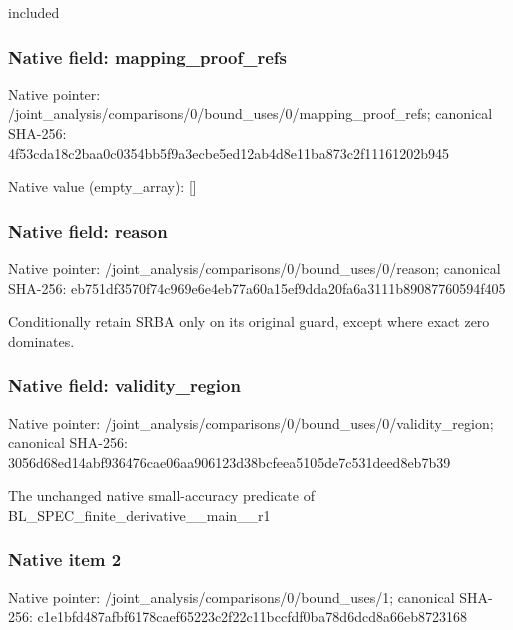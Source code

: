 \documentclass[10pt,a4paper]{article}
\begin{document}
\begingroup\raggedright\sloppy included\par\endgroup

\subsubsection{Native field: mapping\_\allowbreak{}proof\_\allowbreak{}refs}
Native pointer: /joint\_\allowbreak{}analysis/comparisons/0/bound\_\allowbreak{}uses/0/mapping\_\allowbreak{}proof\_\allowbreak{}refs; canonical SHA-256: 4f53cda18c2baa0c0354bb5f9a3ecbe5ed12ab4d8e11ba873c2f11161202b945

Native value (empty\_\allowbreak{}array): []

\subsubsection{Native field: reason}
Native pointer: /joint\_\allowbreak{}analysis/comparisons/0/bound\_\allowbreak{}uses/0/reason; canonical SHA-256: eb751df3570f74c969e6e4eb77a60a15ef9dda20fa6a3111b89087760594f405

\begingroup\raggedright\sloppy Conditionally retain SRBA only on its original guard,\allowbreak{} except where exact zero dominates.\par\endgroup

\subsubsection{Native field: validity\_\allowbreak{}region}
Native pointer: /joint\_\allowbreak{}analysis/comparisons/0/bound\_\allowbreak{}uses/0/validity\_\allowbreak{}region; canonical SHA-256: 3056d68ed14abf936476cae06aa906123d38bcfeea5105de7c531deed8eb7b39

\begingroup\raggedright\sloppy The unchanged native small-accuracy predicate of BL\_\allowbreak{}SPEC\_\allowbreak{}finite\_\allowbreak{}derivative\_\allowbreak{}\_\allowbreak{}main\_\allowbreak{}\_\allowbreak{}r1\par\endgroup

\subsubsection{Native item 2}
Native pointer: /joint\_\allowbreak{}analysis/comparisons/0/bound\_\allowbreak{}uses/1; canonical SHA-256: c1e1bfd487afbf6178caef65223c2f22c11bccfdf0ba78d6dcd8a66eb8723168
\end{document}

